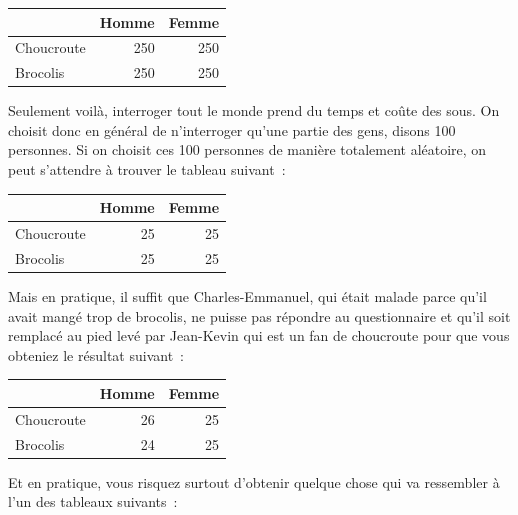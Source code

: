 \documentclass[a4paper,10pt,twoside,francais]{report}
\begin{document}
\begin{center}
  \begin{tabular}[!h]{lrr}
    \toprule
    & Homme & Femme \\
    \midrule
    Choucroute & 250 & 250 \\
    Brocolis & 250 & 250 \\
    \bottomrule
  \end{tabular}
\end{center}

Seulement voilà, interroger tout le monde prend du temps et coûte des
sous. On choisit donc en général de n'interroger qu'une partie des
gens, disons 100 personnes. Si on \og choisit \fg{} ces 100 personnes de
manière totalement aléatoire, on peut s'attendre à trouver le tableau
suivant~:

\begin{center}
  \begin{tabular}[!h]{lrr}
    \toprule
    & Homme & Femme \\
    \midrule
    Choucroute & 25 & 25 \\
    Brocolis & 25 & 25 \\
    \bottomrule
  \end{tabular}
\end{center}

Mais en pratique, il suffit que Charles-Emmanuel, qui était malade
parce qu'il avait mangé trop de brocolis, ne puisse pas répondre au
questionnaire et qu'il soit remplacé au pied levé par Jean-Kevin qui
est un fan de choucroute pour que vous obteniez le résultat suivant~:

\begin{center}
  \begin{tabular}[!h]{lrr}
    \toprule
    & Homme & Femme \\
    \midrule
    Choucroute & 26 & 25 \\
    Brocolis & 24 & 25 \\
    \bottomrule
  \end{tabular}
\end{center}

Et en pratique, vous risquez surtout d'obtenir quelque chose qui va
ressembler à l'un des tableaux suivants~:
\end{document}
